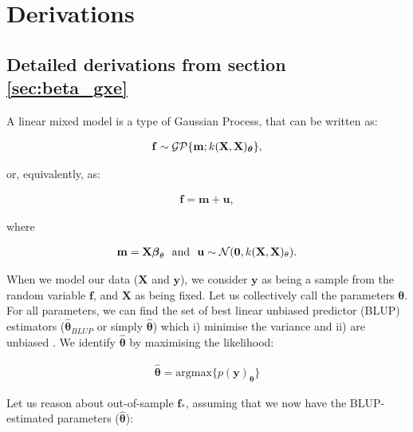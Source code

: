 \section{Derivations}

\subsection{Detailed derivations from section \ref{sec:beta_gxe}}
\label{sec:derivations_blup}

A linear mixed model is a type of Gaussian Process, that can be written as:

\begin{align}
    \mathbf{f} \sim \mathcal{GP}\{\mathbf{m}; k(\mathbf{X}, \mathbf{X})_{\boldsymbol{\theta}}\},
\end{align}

or, equivalently, as:

\begin{align}
    \mathbf{f} = \mathbf{m} + \mathbf{u},
\end{align}

where

\begin{align}
    \mathbf{m} = \mathbf{X} \boldsymbol{\beta}_{\theta}
     \text{~~and~~}
     \mathbf{u} \sim \mathcal N(\mathbf{0}, k(\mathbf{X}, \mathbf{X})_{\theta}). 
\end{align}

When we model our data ($\mathbf{X}$ and $\mathbf{y}$), we consider $\mathbf{y}$ as being a sample from the random variable $\mathbf{f}$, and $\mathbf{X}$ as being fixed.
Let us collectively call the parameters $\boldsymbol{\theta}$.
For all parameters, we can find the set of best linear unbiased predictor (BLUP) estimators ($\hat{\boldsymbol{\theta}}_{BLUP}$ or simply $\hat{\boldsymbol{\theta}}$) which i) minimise the variance and ii) are unbiased \cite{robinson1991blup}. 
We identify $\hat{\boldsymbol{\theta}}$ by maximising the likelihood:

\begin{align}
 \hat{\boldsymbol{\theta}} = \mathrm{argmax} \{p(\mathbf{y})_{\boldsymbol{\theta}}\}
\end{align}

Let us reason about out-of-sample $\mathbf{f}_*$, assuming that we now have the BLUP-estimated parameters ($\hat{\boldsymbol{\theta}}$):

